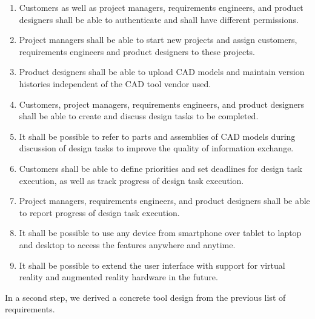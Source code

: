 \begin{enumerate}
    \item Customers as well as project managers, requirements engineers, and product designers shall be able to authenticate and shall have different permissions. 
    \item Project managers shall be able to start new projects and assign customers, requirements engineers and product designers to these projects.
    \item Product designers shall be able to upload CAD models and maintain version histories independent of the CAD tool vendor used.
    \item Customers, project managers, requirements engineers, and product designers shall be able to create and discuss design tasks to be completed.
    \item It shall be possible to refer to parts and assemblies of CAD models during discussion of design tasks to improve the quality of information exchange.
    \item Customers shall be able to define priorities and set deadlines for design task execution, as well as track progress of design task execution.
    \item Project managers, requirements engineers, and product designers shall be able to report progress of design task execution.
    \item It shall be possible to use any device from smartphone over tablet to laptop and desktop to access the features anywhere and anytime.
    \item It shall be possible to extend the user interface with support for virtual reality and augmented reality hardware in the future.
\end{enumerate}

In a second step, we derived a concrete tool design from the previous list of requirements.